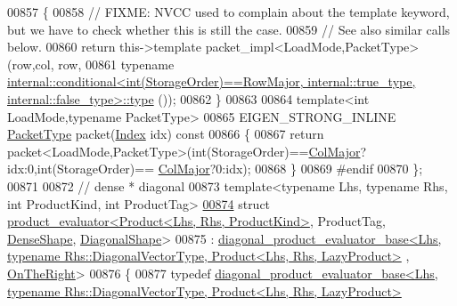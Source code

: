 \begin{DoxyCode}
00857 \textcolor{keyword}{  }\{
00858     \textcolor{comment}{// FIXME: NVCC used to complain about the template keyword, but we have to check whether this is still
       the case.}
00859     \textcolor{comment}{// See also similar calls below.}
00860     \textcolor{keywordflow}{return} this->\textcolor{keyword}{template} packet\_impl<LoadMode,PacketType>(row,col, row,
00861                                  \textcolor{keyword}{typename} 
      \hyperlink{class_eigen_1_1internal_1_1_tensor_lazy_evaluator_writable}{internal::conditional<int(StorageOrder)==RowMajor, internal::true\_type, internal::false\_type>::type}
      ());
00862   \}
00863   
00864   \textcolor{keyword}{template}<\textcolor{keywordtype}{int} LoadMode,\textcolor{keyword}{typename} PacketType>
00865   EIGEN\_STRONG\_INLINE \hyperlink{struct_eigen_1_1_packet_type}{PacketType} packet(\hyperlink{namespace_eigen_a62e77e0933482dafde8fe197d9a2cfde}{Index} idx)\textcolor{keyword}{ const}
00866 \textcolor{keyword}{  }\{
00867     \textcolor{keywordflow}{return} packet<LoadMode,PacketType>(int(StorageOrder)==\hyperlink{group__enums_ggaacded1a18ae58b0f554751f6cdf9eb13a0cbd4bdd0abcfc0224c5fcb5e4f6669a}{ColMajor}?idx:0,int(StorageOrder)==
      \hyperlink{group__enums_ggaacded1a18ae58b0f554751f6cdf9eb13a0cbd4bdd0abcfc0224c5fcb5e4f6669a}{ColMajor}?0:idx);
00868   \}
00869 \textcolor{preprocessor}{#endif}
00870 \};
00871 
00872 \textcolor{comment}{// dense * diagonal}
00873 \textcolor{keyword}{template}<\textcolor{keyword}{typename} Lhs, \textcolor{keyword}{typename} Rhs, \textcolor{keywordtype}{int} ProductKind, \textcolor{keywordtype}{int} ProductTag>
\hyperlink{struct_eigen_1_1internal_1_1product__evaluator_3_01_product_3_01_lhs_00_01_rhs_00_01_product_kin7ddac0b59f4a730d2a73e162a876e10d}{00874} \textcolor{keyword}{struct }\hyperlink{struct_eigen_1_1internal_1_1product__evaluator}{product\_evaluator<Product<Lhs, Rhs, ProductKind>}, 
      ProductTag, \hyperlink{struct_eigen_1_1_dense_shape}{DenseShape}, \hyperlink{struct_eigen_1_1_diagonal_shape}{DiagonalShape}>
00875   : 
      \hyperlink{struct_eigen_1_1internal_1_1diagonal__product__evaluator__base}{diagonal\_product\_evaluator\_base<Lhs, typename Rhs::DiagonalVectorType, Product<Lhs, Rhs, LazyProduct>}
      , \hyperlink{group__enums_ggac22de43beeac7a78b384f99bed5cee0ba99dc75d8e00b6c3a5bdc31940f47492b}{OnTheRight}>
00876 \{
00877   \textcolor{keyword}{typedef} 
      \hyperlink{struct_eigen_1_1internal_1_1diagonal__product__evaluator__base}{diagonal\_product\_evaluator\_base<Lhs, typename Rhs::DiagonalVectorType, Product<Lhs, Rhs, LazyProduct>}

\end{DoxyCode}
